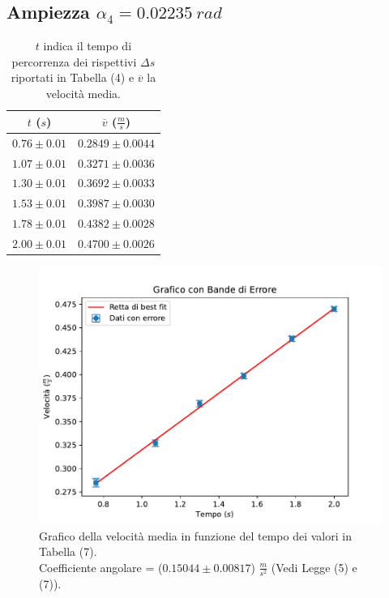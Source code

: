 \documentclass[11pt]{article}
\begin{document}
\subsection{Ampiezza $\alpha_4=0.02235\ rad$}
\begin{table}[H]
\centering
\begin{tabular}{|c|c|}
\hline
\textbf{$t$ ($s$)} & \textbf{$\overline{v}$ ($\frac{m}{s}$)} \\
\hline
$0.76\pm 0.01$ & $0.2849\pm 0.0044$ \\
$1.07\pm 0.01$ & $0.3271\pm 0.0036$ \\
$1.30\pm 0.01$ & $0.3692\pm 0.0033$ \\
$1.53\pm 0.01$ & $0.3987\pm 0.0030$ \\
$1.78\pm 0.01$ & $0.4382\pm 0.0028$ \\
$2.00\pm 0.01$ & $0.4700\pm 0.0026$ \\
\hline
\end{tabular}
\caption{$t$ indica il tempo di percorrenza dei rispettivi $\Delta s$ riportati in Tabella (4) e $\overline{v}$ la velocità media.}
\label{tab:}
\end{table}
\begin{figure}[H]
  \centering
  \includegraphics[width=1\textwidth]{grafico4p1.pdf}
  \caption{Grafico della velocità media in funzione del tempo dei valori in Tabella (7). \\
    Coefficiente angolare = ($0.15044\pm 0.00817$) $\frac{m}{s^2}$ (Vedi Legge (5) e (7)).}
\end{figure}
\end{document}
